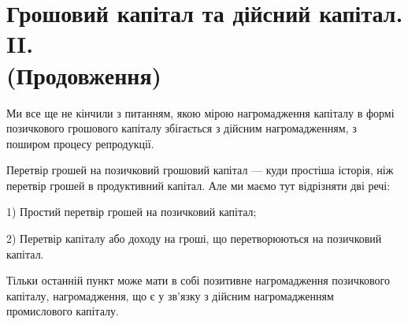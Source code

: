\section[Грошовий капітал та дійсний капітал. II. (Продовження)]{Грошовий капітал та дійсний капітал. II. \\ (Продовження)}

Ми все ще не кінчили з питанням, якою мірою нагромадження капіталу в
формі позичкового грошового капіталу збігається з дійсним нагромадженням,
з поширом процесу репродукції.

Перетвір грошей на позичковий грошовий капітал — куди простіша історія,
ніж перетвір грошей в продуктивний капітал. Але ми маємо тут відрізняти дві
речі:

1) Простий перетвір грошей на позичковий капітал;

2) Перетвір капіталу або доходу на гроші, що перетворюються на позичковий
капітал.

Тільки останній пункт може мати в собі позитивне нагромадження позичкового
капіталу, нагромадження, що є у зв’язку з дійсним нагромадженням
промислового капіталу.
